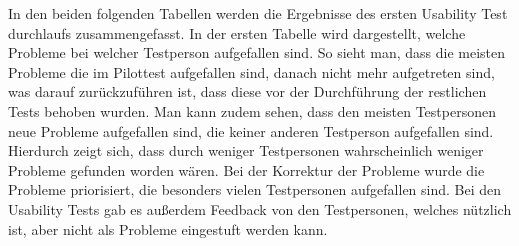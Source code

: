 In den beiden folgenden Tabellen werden die Ergebnisse des ersten Usability Test durchlaufs zusammengefasst. In der ersten Tabelle wird dargestellt, welche Probleme bei welcher Testperson aufgefallen sind. So sieht man, dass die meisten Probleme die im Pilottest aufgefallen sind, danach nicht mehr aufgetreten sind, was darauf zurückzuführen ist, dass diese vor der Durchführung der restlichen Tests behoben wurden. Man kann zudem sehen, dass den meisten Testpersonen neue Probleme aufgefallen sind, die keiner anderen Testperson aufgefallen sind. Hierdurch zeigt sich, dass durch weniger Testpersonen wahrscheinlich weniger Probleme gefunden worden wären. Bei der Korrektur der Probleme wurde die Probleme priorisiert, die besonders vielen Testpersonen aufgefallen sind. Bei den Usability Tests gab es außerdem Feedback von den Testpersonen, welches nützlich ist, aber nicht als Probleme eingestuft werden kann.

